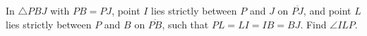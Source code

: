 In $\triangle PBJ$ with $PB=PJ$, point $I$ lies strictly between $P$ and $J$ on $\overline{PJ}$, and point $L$ lies strictly between $P$ and $B$ on $\overline{PB}$, such that $PL=LI=IB=BJ$. Find $\angle ILP$.
